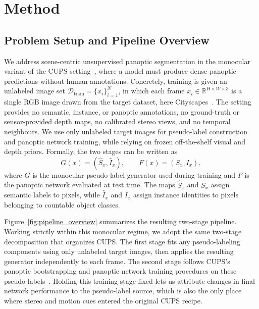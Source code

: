 \documentclass[10pt,twocolumn,letterpaper]{article}
\begin{document}
\section{Method}
\label{sec:method}

\subsection{Problem Setup and Pipeline Overview}
\label{sec:method:setup}

We address scene-centric unsupervised panoptic segmentation in the monocular variant of the CUPS setting~\cite{hahn2025cups}, where a model must produce dense panoptic predictions without human annotations. Concretely, training is given an unlabeled image set $\mathcal{D}_{\text{train}} = \{x_i\}_{i=1}^{N}$, in which each frame $x_i \in \mathbb{R}^{H \times W \times 3}$ is a single RGB image drawn from the target dataset, here Cityscapes~\cite{cordts2016cityscapes}. The setting provides no semantic, instance, or panoptic annotations, no ground-truth or sensor-provided depth maps, no calibrated stereo views, and no temporal neighbours. We use only unlabeled target images for pseudo-label construction and panoptic network training, while relying on frozen off-the-shelf visual and depth priors. Formally, the two stages can be written as
\begin{equation}
G(x) = (\hat S_x, \hat I_x), \qquad F(x) = (S_x, I_x),
\label{eq:pipeline}
\end{equation}
where $G$ is the monocular pseudo-label generator used during training and $F$ is the panoptic network evaluated at test time. The maps $\hat S_x$ and $S_x$ assign semantic labels to pixels, while $\hat I_x$ and $I_x$ assign instance identities to pixels belonging to countable object classes.

Figure~\ref{fig:pipeline_overview} summarizes the resulting two-stage pipeline. Working strictly within this monocular regime, we adopt the same two-stage decomposition that organizes CUPS. The first stage fits any pseudo-labeling components using only unlabeled target images, then applies the resulting generator independently to each frame. The second stage follows CUPS's panoptic bootstrapping and panoptic network training procedures on these pseudo-labels~\cite{hahn2025cups}. Holding this training stage fixed lets us attribute changes in final network performance to the pseudo-label source, which is also the only place where stereo and motion cues entered the original CUPS recipe.
\end{document}
